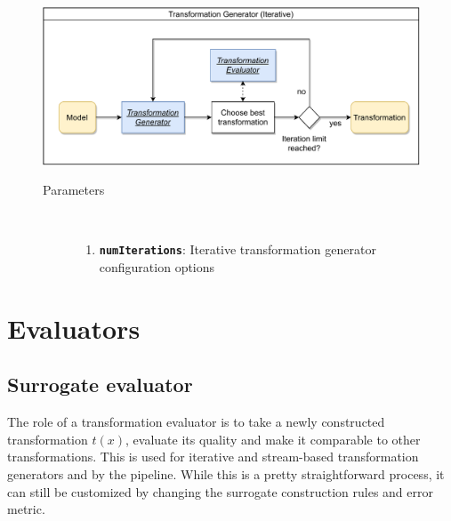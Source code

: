 \documentclass[
  a4paper,  %
  twoside,  %
  bibliography=totoc,
  headsepline,
  cleardoublepage=empty,
  parskip=half,
  draft=false
]{scrbook}
\begin{document}
\begin{figure}[H]
	\includegraphics[width=\textwidth]{graphics/TransformationGen_Iterative.pdf}

\vspace{-1.5mm}

\begin{mdframed}[linewidth=0.7px]

\begin{description}
\item[Parameters] {~ \begin{enumerate}[\indent{}]
\item \texttt{\textbf{numIterations}}: Iterative transformation generator configuration options
\end{enumerate}}
\end{description}

\end{mdframed}
\end{figure}

\newpage
\section {Evaluators}

\subsection {Surrogate evaluator}

The role of a transformation evaluator is to take a newly constructed transformation $t(x)$, evaluate its quality and make it comparable to other transformations.
This is used for iterative and stream-based transformation generators and by the pipeline.
While this is a pretty straightforward process, it can still be customized by changing the surrogate construction rules and error metric.
\end{document}
